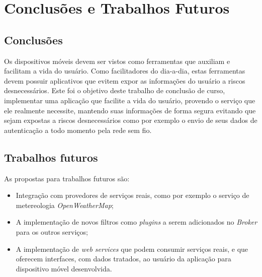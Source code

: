 \chapter{Conclusões e Trabalhos Futuros}\label{cha:conclusao}

\section{Conclusões}
Os dispositivos móveis devem ser vistos como ferramentas que auxiliam e facilitam a vida do usuário. Como facilitadores do dia-a-dia, estas ferramentas devem possuir aplicativos que evitem expor as informações do usuário a riscos desnecessários. Este foi o objetivo deste trabalho de conclusão de curso, implementar uma aplicação que facilite a vida do usuário, provendo o serviço que ele realmente necessite, mantendo suas informações de forma segura evitando que sejam expostas a riscos desnecessários como por exemplo o envio de seus dados de autenticação a todo momento pela rede sem fio.

\section{Trabalhos futuros}
As propostas para trabalhos futuros são:
\begin{itemize}
	\item Integração com provedores de serviços reais, como por exemplo o serviço de metereologia \textit{OpenWeatherMap};
	\item A implementação de novos filtros como \textit{plugins} a serem adicionados no \textit{Broker} para os outros serviços;
	\item A implementação de \textit{web services} que podem consumir serviços reais, e que oferecem interfaces, com dados tratados, ao usuário da aplicação para dispositivo móvel desenvolvida.
\end{itemize}